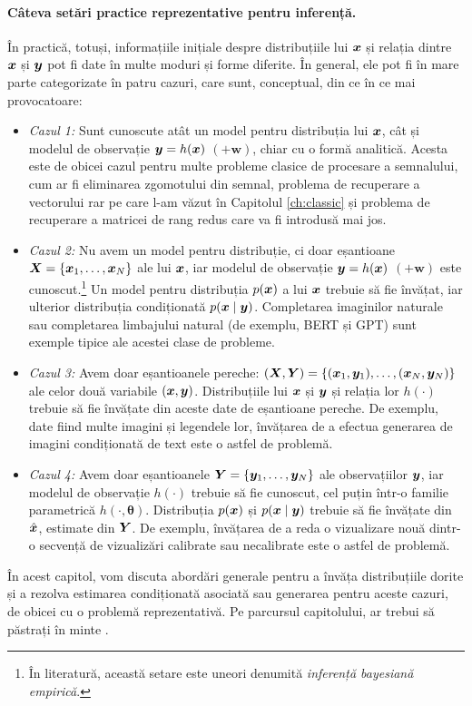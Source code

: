 \documentclass[../../book-main_ro.tex]{subfiles}
\begin{document}
\paragraph{Câteva setări practice reprezentative pentru inferență.} 
În practică, totuși, informațiile inițiale despre distribuțiile lui $\bm{x}$ și relația dintre $\bm{x}$ și $\bm{y}$ pot fi date în multe moduri și forme diferite. În general, ele pot fi în mare parte categorizate în patru cazuri, care sunt, conceptual, din ce în ce mai provocatoare:
\begin{itemize}
\item {\em Cazul 1:} Sunt cunoscute atât un model pentru distribuția lui $\bm{x}$, cât și modelul de observație $\bm{y} = h(\bm{x})$ $(+ \boldsymbol{w})$, chiar cu o formă analitică. Acesta este de obicei cazul pentru multe probleme clasice de procesare a semnalului, cum ar fi eliminarea zgomotului din semnal, problema de recuperare a vectorului rar pe care l-am văzut în Capitolul \ref{ch:classic} și problema de recuperare a matricei de rang redus care va fi introdusă mai jos.
\item {\em Cazul 2:} Nu avem un model pentru distribuție, ci doar eșantioane $\bm{X} = \{\bm{x}_1, \ldots, \bm{x}_N\}$ ale lui $\bm{x}$, iar modelul de observație $\bm{y} = h(\bm{x})$ $ (+ \boldsymbol{w})$ este cunoscut.\footnote{În literatură, această setare este uneori denumită {\em inferență bayesiană empirică}.} Un model pentru distribuția $p(\bm{x})$ a lui $\bm{x}$ trebuie să fie învățat, iar ulterior distribuția condiționată $p(\bm{x}\mid \bm{y})$. Completarea imaginilor naturale sau completarea limbajului natural (de exemplu, BERT și GPT) sunt exemple tipice ale acestei clase de probleme.
\item {\em Cazul 3:} Avem doar eșantioanele pereche: $(\bm{X}, \bm{Y}) = \{ (\bm{x}_1, \bm{y}_1), \ldots, (\bm{x}_N, \bm{y}_N) \}$ ale celor două variabile $(\bm{x}, \bm{y})$. Distribuțiile lui $\bm{x}$ și $\bm{y}$ și relația lor $h(\cdot)$ trebuie să fie învățate din aceste date de eșantioane pereche. De exemplu, date fiind multe imagini și legendele lor, învățarea de a efectua generarea de imagini condiționată de text este o astfel de problemă.
\item {\em Cazul 4:} Avem doar eșantioanele $\bm{Y} = \{\bm{y}_1, \ldots, \bm{y}_N\}$ ale observațiilor $\bm{y}$, iar modelul de observație $h(\cdot)$ trebuie să fie cunoscut, cel puțin într-o familie parametrică $h(\cdot, \boldsymbol{\theta})$. Distribuția $p(\bm{x})$ și $p(\bm{x} \mid \bm{y})$ trebuie să fie învățate din $\hat {\bm{x}}$, estimate din $\bm{Y}$. De exemplu, învățarea de a reda o vizualizare nouă dintr-o secvență de vizualizări calibrate sau necalibrate este o astfel de problemă.
\end{itemize}
În acest capitol, vom discuta abordări generale pentru a învăța distribuțiile dorite și a rezolva estimarea condiționată asociată sau generarea pentru aceste cazuri, de obicei cu o problemă reprezentativă. Pe parcursul capitolului, ar trebui să păstrați în minte .
\end{document}
